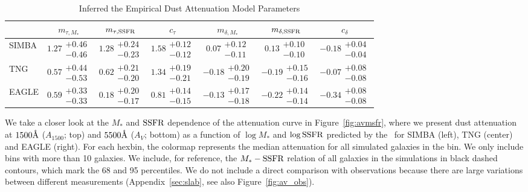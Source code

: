\begin{table}
    \caption{Inferred the Empirical Dust Attenuation Model Parameters}
    \begin{tabular}{lcccccc} \toprule
        & $m_{\tau,M_*}$ & $m_{\tau,{\rm SSFR}}$ & $c_\tau$ & $m_{\delta,M_*}$ & $m_{\delta,{\rm SSFR}}$ & $c_\delta$ \\[3pt] \hline\hline
        SIMBA   & $1.27\substack{+0.46\\-0.46}$ &
        $1.28\substack{+0.24\\-0.23}$ & $1.58\substack{+0.12\\-0.12}$ &
        $0.07 \substack{+0.12\\-0.11}$ & $0.13 \substack{+0.10\\-0.10}$ &
        $-0.18\substack{+0.04\\-0.04}$ \\
        TNG     & $0.57\substack{+0.44\\-0.53}$ &
        $0.62\substack{+0.21\\-0.20}$ & $1.34\substack{+0.19\\-0.21}$ &
        $-0.18\substack{+0.20\\-0.19}$ & $-0.19\substack{+0.15\\-0.16}$ &
        $-0.07\substack{+0.08\\-0.08}$ \\
        EAGLE   & $0.59\substack{+0.33\\-0.33}$ &
        $0.18\substack{+0.20\\-0.17}$ & $0.81\substack{+0.14\\-0.15}$ &
        $-0.13\substack{+0.17\\-0.18}$ & $-0.22\substack{+0.14\\-0.14}$ &
        $-0.34\substack{+0.08\\-0.08}$\\
        \hline
    \end{tabular} \label{tab:posterior}
\end{table}

We take a closer look at the $M_*$ and ${\rm SSFR}$ dependence of the attenuation
curve in Figure~\ref{fig:avmsfr}, where we present dust attenuation at
$1500\AA$ ($A_{1500}$; top) and $5500\AA$
($A_V$; bottom) as a function of $\log M_*$ and $\log {\rm SSFR}$ predicted by the
\eda~for SIMBA (left), TNG (center) and EAGLE (right). 
For each hexbin, the colormap represents the median attenuation for all
simulated galaxies in the bin. 
We only include bins with more than 10 galaxies. 
We include, for reference, the $M_* - {\rm SSFR}$ relation of all galaxies in the
simulations in black dashed contours, which mark the 68 and 95 percentiles.
We do not include a direct comparison with observations because there are large
variations between different measurements (Appendix~\ref{sec:slab}, see also
Figure~\ref{fig:av_obs}).  

